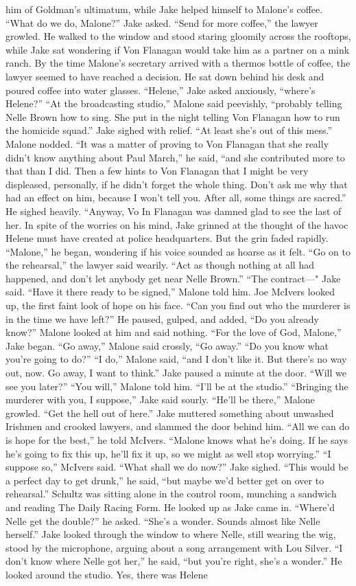 \documentclass{novel}
\begin{document}
him of Goldman’s ultimatum, while Jake helped himself to Malone’s coffee. “What do we do, Malone?” Jake asked. “Send for more coffee,” the lawyer growled. He walked to the window and stood staring gloomily across the rooftops, while Jake sat wondering if Von Flanagan would take him as a partner on a mink ranch. By the time Malone’s secretary arrived with a thermos bottle of coffee, the lawyer seemed to have reached a decision. He sat down behind his desk and poured coffee into water glasses. “Helene,” Jake asked anxiously, “where’s Helene?” “At the broadcasting studio,” Malone said peevishly, “probably telling Nelle Brown how to sing. She put in the night telling Von Flanagan how to run the homicide squad.” Jake sighed with relief. “At least she’s out of this mess.” Malone nodded. “It was a matter of proving to Von Flanagan that she really didn’t know anything about Paul March,” he said, “and she contributed more to that than I did. Then a few hints to Von Flanagan that I might be very displeased, personally, if he didn’t forget the whole thing. Don’t ask me why that had an effect on him, because I won’t tell you. After all, some things are sacred.” He sighed heavily. “Anyway, Vo In Flanagan was damned glad to see the last of her. In spite of the worries on his mind, Jake grinned at the thought of the havoc Helene must have created at police headquarters. But the grin faded rapidly. “Malone,” he began, wondering if his voice sounded as hoarse as it felt. “Go on to the rehearsal,” the lawyer said wearily. “Act as though nothing at all had happened, and don’t let anybody get near Nelle Brown.” “The contract—" Jake said. “Have it there ready to be signed,” Malone told him. Joe McIvers looked up, the first faint look of hope on his face. “Can you find out who the murderer is in the time we have left?” He paused, gulped, and added, “Do you already know?” Malone looked at him and said nothing. “For the love of God, Malone,” Jake began. “Go away,” Malone said crossly, “Go away.” “Do you know what you’re going to do?” “I do,” Malone said, “and I don’t like it. But there’s no way out, now. Go away, I want to think.” Jake paused a minute at the door. “Will we see you later?” “You will,” Malone told him. “I’ll be at the studio.” “Bringing the murderer with you, I suppose,” Jake said sourly. “He’ll be there,” Malone growled. “Get the hell out of here.” Jake muttered something about unwashed Irishmen and crooked lawyers, and slammed the door behind him. “All we can do is hope for the best,” he told McIvers. “Malone knows what he’s doing. If he says he’s going to fix this up, he’ll fix it up, so we might as well stop worrying.” “I suppose so,” McIvers said. “What shall we do now?” Jake sighed. “This would be a perfect day to get drunk,” he said, “but maybe we’d better get on over to rehearsal.” Schultz was sitting alone in the control room, munching a sandwich and reading The Daily Racing Form. He looked up as Jake came in. “Where’d Nelle get the double?” he asked. “She’s a wonder. Sounds almost like Nelle herself.” Jake looked through the window to where Nelle, still wearing the wig, stood by the microphone, arguing about a song arrangement with Lou Silver. “I don’t know where Nelle got her,” he said, “but you’re right, she’s a wonder.” He looked around the studio. Yes, there was Helene 
\end{document}
